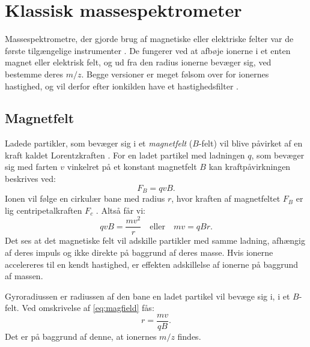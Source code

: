 \section{Klassisk massespektrometer}
Massespektrometre, der gjorde brug af magnetiske eller elektriske felter var de første tilgængelige instrumenter \parencite{mstextbook}.
De fungerer ved at afbøje ionerne i et enten magnet eller elektrisk felt, og ud fra den radius ionerne bevæger sig, ved bestemme deres $m/z$.
Begge versioner er meget følsom over for ionernes hastighed, og vil derfor efter ionkilden have et hastighedsfilter \parencite{orbitAstx}.
\subsection{Magnetfelt}
Ladede partikler, som bevæger sig i et \emph{magnetfelt} ($B$-felt) vil blive påvirket af en kraft kaldet Lorentzkraften \parencite{orbitAstx}.
For en ladet partikel med ladningen $q$, som bevæger sig med farten $v$ vinkelret på et konstant magnetfelt $B$ kan kraftpåvirkningen beskrives ved:
\begin{equation}
	F_B = qvB.
\end{equation}
Ionen vil følge en cirkulær bane med radius $r$, hvor kraften af magnetfeltet $F_B$ er lig centripetalkraften $F_c$ \parencite{orbitAstx}. Altså får vi:
\begin{equation}\label{eq:magfield}
	qvB = \frac{mv^2}{r}\quad\text{eller}\quad mv = qBr.
\end{equation}
Det ses at det magnetiske felt vil adskille partikler med samme ladning, afhængig af deres impuls og ikke direkte på baggrund af deres masse.
Hvis ionerne accelereres til en kendt hastighed, er effekten adskillelse af ionerne på baggrund af massen.
\par Gyroradiussen er radiussen af den bane en ladet partikel vil bevæge sig i, i et $B$-felt. Ved omskrivelse af \cref{eq:magfield} fås:
\begin{equation}
	r = \frac{mv}{qB}.
\end{equation}
Det er på baggrund af denne, at ionernes $m/z$ findes.
